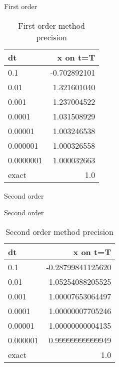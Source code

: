 \documentclass[10pt]{beamer}
\begin{document}
\begin{frame}{First order}
  \begin{table}
    \caption{First order method precision}
    \begin{tabular}{lr}
      \toprule
      dt & x on t=T\\
      \midrule
      0.1 & -0.702892101\\
      0.01 & 1.321601040\\
      0.001 & 1.237004522\\
      0.0001 & 1.031508929\\
      0.00001 & 1.003246538\\
      0.000001 & 1.000326558\\
      0.0000001 & 1.000032663\\
      \midrule
      exact & 1.0 \\
      \bottomrule
    \end{tabular}
  \end{table}
\end{frame}

\begin{frame}{Second order}
  \begin{figure}
  \end{figure}
\end{frame}

\begin{frame}{Second order}
  \begin{table}
    \caption{Second order method precision}
    \begin{tabular}{lr}
      \toprule
      dt & x on t=T\\
      \midrule
      0.1 & -0.28799841125620\\
      0.01 & 1.05254088205525\\
      0.001 & 1.00007653064497\\
      0.0001 & 1.00000007705246\\
      0.00001 & 1.00000000004135\\
      0.000001 & 0.99999999999949\\
      \midrule
      exact & 1.0 \\
      \bottomrule
    \end{tabular}
  \end{table}
\end{frame}
\end{document}
